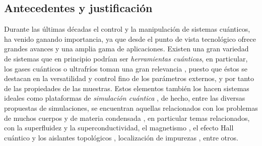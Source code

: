 \documentclass[superscriptaddress,onecolumn,aps,preprint,showpacs,nofootinbib,pra,11pt]{revtex4-2}
\begin{document}
    \begin{normalsize}
    
\section{Antecedentes y justificación}


Durante las últimas décadas el control y la manipulación de sistemas cuánticos, ha venido ganando importancia, ya que desde el punto de vista tecnológico ofrece grandes avances y una amplia gama de aplicaciones. Existen una gran variedad de sistemas que en principio podrían ser \textit{herramientas cuánticas}, en particular, los gases cuánticos o ultrafríos toman una gran relevancia \cite{Cornell-revmodphys74,Ketterle-revmodphys74, DeMarco-science285}, puesto que éstos se destacan en la versatilidad y control fino de los parámetros externos, y por tanto de las propiedades de las muestras. Estos elementos también los hacen sistemas ideales como plataformas de \textit{simulación cuántica} \cite{Bloch-naturephys8, Bloch-revmodphys80}, de hecho, entre las diversas propuestas de simulaciones, se encuentran aquellas relacionados con los problemas de muchos cuerpos y de materia condensada \cite{Bloch-naturephys8, Hofstetter-jpb51}, en particular temas relacionados, con la superfluidez y la superconductividad, el magnetismo \cite{Porto-science340, Greif-science340}, el efecto Hall cuántico y los aislantes topológicos \cite{Goldman-naturephys12}, localización de impurezas \cite{Li-scirep3}, entre otros. \medskip


\end{normalsize}
\end{document}
